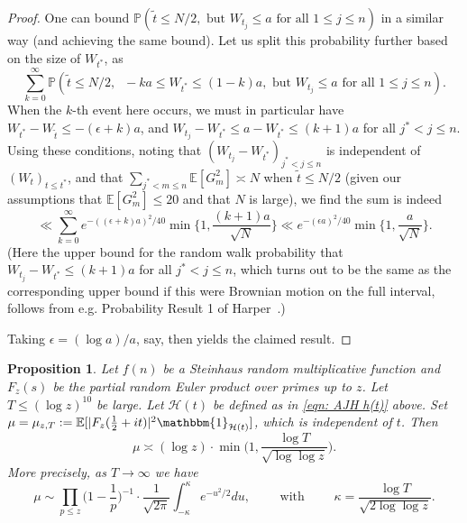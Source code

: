 \documentclass[12pt, notitlepage]{amsart}
\numberwithin{equation}{section}
\def\P{\mathbb P}
\def\E{\mathbb E}
\newtheorem{proposition}[theorem]{Proposition}
\theoremstyle{remark}
\theoremstyle{definition}
\theoremstyle{remark}
\numberwithin{equation}{section}
\begin{document}
\begin{proof}
One can bound $\P(\tilde{t} \leq N/2 , \text{  but  }  W_{t_j} \leq a \text{ for all } 1 \leq j \leq n)$ in a similar way (and achieving the same bound). Let us split this probability further based on the size of $W_{t^*}$, as
$$ \sum_{k=0}^{\infty} \P(\tilde{t} \leq N/2 , \;\; -ka \leq W_{t^{*}} \leq (1-k)a , \text{  but  }  W_{t_j} \leq a \text{ for all } 1 \leq j \leq n) . $$
When the $k$-th event here occurs, we must in particular have $W_{t^{*}} - W_{\tilde{t}} \leq -(\epsilon + k)a$, and $W_{t_j} - W_{t^{*}} \leq a - W_{t^{*}} \leq (k+1)a$ for all $j^{*} < j \leq n$. Using these conditions, noting that $(W_{t_j} - W_{t^{*}})_{j^{*} < j \leq n}$ is independent of $(W_{t})_{t \leq t^{*}}$, and that $\sum_{j^{*} < m \leq n} \E [G_m^2 ] \asymp N$ when $\tilde{t} \leq N/2$ (given our assumptions that $\E [G_m^2 ] \leq 20$ and that $N$ is large), we find the sum is indeed
$$ \ll \sum_{k=0}^{\infty} e^{-((\epsilon + k) a)^{2}/40} \min\Big\{1, \frac{(k+1)a}{\sqrt{N}}\Big\} \ll e^{-(\epsilon a)^{2}/40} \min\Big\{1, \frac{a}{\sqrt{N}}\Big\} . $$
(Here the upper bound for the random walk probability that $W_{t_j} - W_{t^{*}} \leq (k+1)a$ for all $j^{*} < j \leq n$, which turns out to be the same as the corresponding upper bound if this were Brownian motion on the full interval, follows from e.g. Probability Result 1 of Harper~\cite{HarperLow}.)  

Taking $\epsilon = (\log a)/a$, say, then yields the claimed result.
\end{proof}

 \begin{proposition}\label{prop: mu}
     Let $f(n)$ be a Steinhaus random multiplicative function and $F_z(s)$ be the partial random Euler product over primes up to $z$. Let $T \le (\log z)^{10}$ be large. Let $\mathcal{H}(t)$ be defined as in \eqref{eqn: AJH h(t)} above. Set $\mu = \mu_{z, T}: = \E[|F_z(\tfrac{1}{2} + it)|^{2} \mathbbm{1}_{\mathcal{H}(t)}]$, which is independent of $t$.   
    Then    
    \begin{equation}\label{eqn: mu}
    \mu  \asymp (\log z) \cdot  \min \Big( 1, \frac{\log T}{\sqrt{\log \log z}} \Big).    
    \end{equation}
More precisely, as $T \rightarrow \infty$ we have 
$$
\mu  \sim \prod_{p \le z}\Big(1 - \frac{1}{p}\Big)^{-1} \cdot \frac{1}{\sqrt{2\pi}} \int_{-\kappa}^{\kappa} e^{-u^{2}/2} du, \qquad \text{ with }\qquad \kappa = \frac{\log T}{\sqrt{2\log \log z}}.
$$
  \end{proposition}
 
\end{document}
